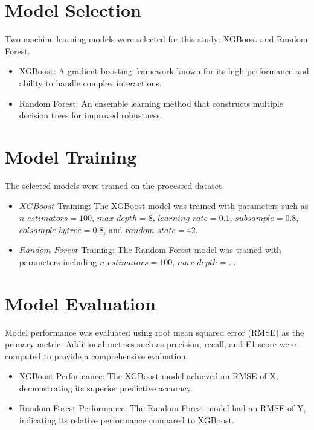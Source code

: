 \documentclass{article}
\begin{document}
\section{Model Selection}

Two machine learning models were selected for this study: XGBoost and Random Forest.
\begin{itemize}
    \item XGBoost: A gradient boosting framework known for its high performance and ability to handle complex interactions.
    \item Random Forest: An ensemble learning method that constructs multiple decision trees for improved robustness.
\end{itemize}

\section{Model Training}
The selected models were trained on the processed dataset.

\begin{itemize}
    \item $XGBoost$ Training: The XGBoost model was trained with parameters such as $n\_estimators=100$, $max\_depth=8$, $learning\_rate=0.1$, $subsample=0.8$, $colsample\_bytree=0.8$, and $random\_state=42$.
    \item $Random$ $Forest$ Training: The Random Forest model was trained with parameters including $n\_estimators=100$, $max\_depth=...$
\end{itemize}

\section{Model Evaluation}
Model performance was evaluated using root mean squared error (RMSE) as the primary metric. Additional metrics such as precision, recall, and F1-score were computed to provide a comprehensive evaluation.
\begin{itemize}
    \item XGBoost Performance: The XGBoost model achieved an RMSE of X, demonstrating its superior predictive accuracy.
    \item Random Forest Performance: The Random Forest model had an RMSE of Y, indicating its relative performance compared to XGBoost.
\end{itemize}
\end{document}
